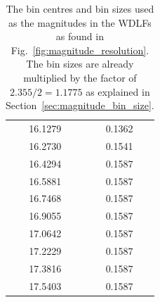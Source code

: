 \documentclass[fleqn,usenatbib]{mnras}
\begin{document}
\begin{table}
\begin{tabular}{c|c}
        16.1279 & 0.1362\\
        16.2730 & 0.1541\\
        16.4294 & 0.1587\\
        16.5881 & 0.1587\\
        16.7468 & 0.1587\\\hline
        16.9055 & 0.1587\\
        17.0642 & 0.1587\\
        17.2229 & 0.1587\\
        17.3816 & 0.1587\\
        17.5403 & 0.1587\\\hline
            \end{tabular}
    \caption{The bin centres and bin sizes used as the magnitudes in the WDLFs
    as found in Fig.~\ref{fig:magnitude_resolution}. The bin sizes are already 
    multiplied by the factor of $2.355 /2 = 1.1775$ as explained in Section~\ref{sec:magnitude_bin_size}.}
    \label{tab:magnitude_resolution}
\end{table}

\end{document}
